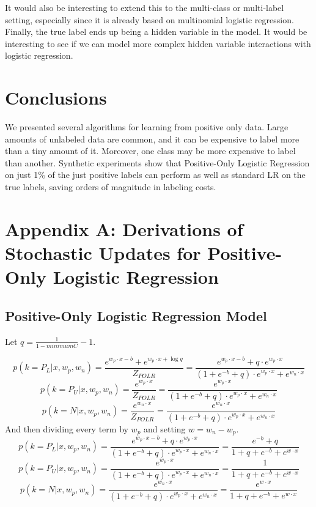 \documentclass{article}
\begin{document}
It would also be interesting to extend this to the multi-class or multi-label setting, especially since it is already based on multinomial logistic regression. Finally, the true label ends up being a hidden variable in the model. It would be interesting to see if we can model more complex hidden variable interactions with logistic regression.

\section{Conclusions}

We presented several algorithms for learning from positive only data. Large amounts of unlabeled data are common, and it can be expensive to label more than a tiny amount of it.  Moreover, one class may be more expensive to label than another. Synthetic experiments show that Positive-Only Logistic Regression on just 1\% of the just positive labels can perform as well as standard LR on the true labels, saving orders of magnitude in labeling costs.




\onecolumn

\section{Appendix A: Derivations of Stochastic Updates for Positive-Only Logistic Regression}

\subsection{Positive-Only Logistic Regression Model}

Let $q = \frac{1}{1 - minimumC} - 1$.

$$
p(k=P_L | x, w_p, w_n) =  \frac{e^{w_p \cdot x - b} + e^{w_p \cdot x + \log{q}}}{Z_{POLR}} 
				     = \frac{e^{w_p \cdot x - b} + q \cdot e^{w_p \cdot x}}{(1 + e^{-b} + q) \cdot e^{w_p \cdot x} + e^{w_n \cdot x}} 
$$
$$
p(k=P_U | x, w_p, w_n) =  \frac{e^{w_p \cdot x}}{Z_{POLR}} 
				     = \frac{e^{w_p \cdot x}}{(1 + e^{-b} + q) \cdot e^{w_p \cdot x} + e^{w_n \cdot x}} 
$$
$$
p(k=N | x, w_p, w_n) =  \frac{e^{w_n \cdot x}}{Z_{POLR}} 
				 = \frac{e^{w_n \cdot x}}{(1 + e^{-b} + q) \cdot e^{w_p \cdot x} + e^{w_n \cdot x}} 
$$
And then dividing every term by $w_p$ and setting $w = w_n - w_p$.
$$
p(k=P_L | x, w_p, w_n) = \frac{e^{w_p \cdot x - b} + q \cdot e^{w_p \cdot x}}{(1 + e^{-b} + q) \cdot e^{w_p \cdot x} + e^{w_n \cdot x}} 
 				     = \frac{e^{-b} + q}{1 + q + e^{-b} + e^{w \cdot x}}
$$
$$
p(k=P_U | x, w_p, w_n) = \frac{e^{w_p \cdot x}}{(1 + e^{-b} + q) \cdot e^{w_p \cdot x} + e^{w_n \cdot x}} 
				     = \frac{1}{1 + q + e^{-b} + e^{w \cdot x}}
$$
$$
p(k=N | x, w_p, w_n) = \frac{e^{w_n \cdot x}}{(1 + e^{-b} + q) \cdot e^{w_p \cdot x} + e^{w_n \cdot x}} 
				= \frac{e^{w \cdot x}}{1 + q + e^{-b} + e^{w \cdot x}}
$$
\end{document}
